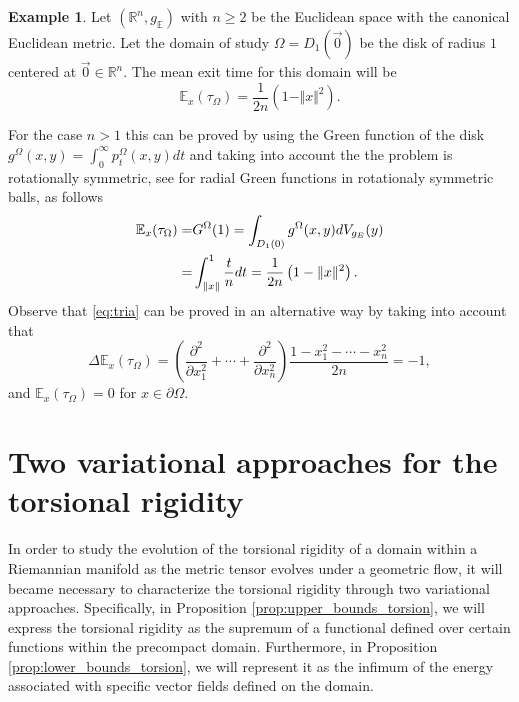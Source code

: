\documentclass{amsart}
\theoremstyle{definition}
\newtheorem{example}[theorem]{Example}
\theoremstyle{remark}
\newcommand{\V}{{\rm V}}
\begin{document}
\begin{example}\label{ex1}
    Let $(\mathbb{R}^n,g_\mathbb{E})$ with $n\geq 2$ be the Euclidean space with the canonical  Euclidean metric. Let the domain of study $\Omega = D_{1}(\vec{0})$  be the disk of radius $1$ centered at $\vec{0}\in \mathbb{R}^n$. The mean exit time for this domain will be 
    \begin{equation}\label{eq:tria}
 \mathbb{E}_x(\tau_\Omega)=  \frac{1}{2n}\left(1-\Vert x\Vert ^2\right).      
    \end{equation}

 For the case $n>1$ this can be proved by using the Green function of the disk $g^{\Omega}(x,y)=\int_0^\infty p_t^\Omega(x,y)dt$ and taking into account the the problem is rotationally symmetric, see \cite{Bessa2020} for radial Green functions in rotationaly symmetric balls, as  follows
  \begin{equation*}
    \begin{aligned}
        \mathbb{E}_{x}(\tau_\Omega)=& G^\Omega(1)= \int_{D_{1}(0)} g^\Omega(x,y) d\V_{g_E}(y)\\
        =& \int_{\Vert x\Vert}^1 \frac{t}{n}dt = \frac{1}{2n}\left(1-\Vert x\Vert^2\right).
    \end{aligned}
    \end{equation*}
Observe that \eqref{eq:tria} can be proved in an alternative way by taking into account that
    $$
\Delta \mathbb{E}_x(\tau_\Omega)=\left(\frac{\partial^2}{\partial x_1^2}+\cdots+\frac{\partial^2}{\partial x_n^2}\right)\frac{1-x_1^2-\cdots-x_n^2}{2n}=-1,
    $$
and $\mathbb{E}_x(\tau_\Omega)=0$  for   $x\in \partial \Omega$.
  \end{example}



\section{Two variational approaches for the torsional rigidity}\label{sec:bounds}

In order to study the evolution of the torsional rigidity of a domain within a Riemannian manifold as the metric tensor evolves under a geometric flow, it will became necessary to characterize the torsional rigidity through two variational approaches. Specifically, in Proposition \ref{prop:upper_bounds_torsion}, we will express the torsional rigidity as the supremum of a functional defined over certain functions within the precompact domain. Furthermore, in Proposition \ref{prop:lower_bounds_torsion}, we will represent it as the infimum of the energy associated with specific vector fields defined on the domain.
\end{document}
